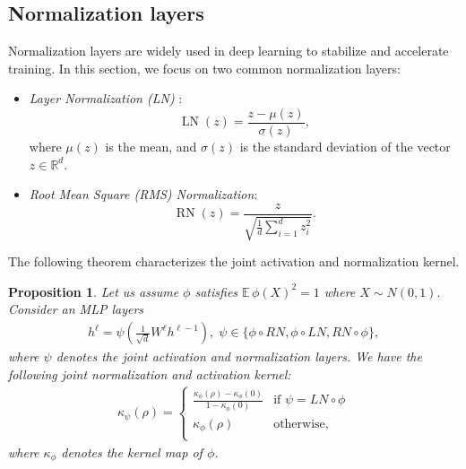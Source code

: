 \documentclass[twoside]{article}
\newcommand{\km}{\kappa_\phi}
\newcommand{\E}{\mathbb{E}\,}
\newcommand{\R}{\mathbb{R}}
\newtheorem{proposition}{Proposition}
\theoremstyle{definition}
\begin{document}

\subsection{Normalization layers}

Normalization layers are widely used in deep learning to stabilize and accelerate training. In this section, we focus on two common normalization layers:
\begin{itemize}
    \item \textit{Layer Normalization (LN)} \citep{ba2016layer}:
  \begin{equation}
  \operatorname{LN}(z) = \frac{z - \mu(z)}{\sigma(z)},
  \end{equation}
  where $\mu(z)$ is the mean, and $\sigma(z)$ is the standard deviation of the vector $z \in \R^d$.
  \item \textit{Root Mean Square (RMS) Normalization}:
  \begin{equation}
  \operatorname{RN}(z) = \frac{z}{ \sqrt{ \frac{1}{d} \sum_{i=1}^d z_i^2 } }.
  \end{equation}
\end{itemize}

The following theorem characterizes the joint activation and normalization kernel.

\begin{proposition}
\label{prop:normalization_kernel_map}
Let us assume $\phi$ satisfies $\E \phi(X)^2 = 1$ where $X\sim N(0,1).$ Consider an MLP layers 
\begin{align*}
    h^\ell = \psi\left( \frac{1}{\sqrt{d}}W^\ell h^{\ell-1}\right),
    \; \psi \in \{\phi\circ RN,\phi\circ LN, RN\circ \phi\},
\end{align*}
where $\psi$ denotes the joint activation and normalization layers. 
We have the following joint normalization and activation kernel:
\begin{align*}
    \kappa_\psi(\rho) = \begin{cases}
         \frac{\km(\rho)-\km(0)}{1-\km(0)} & \text{if } \psi=LN\circ \phi\\
        \km(\rho) & \text{otherwise},\\
    \end{cases}
\end{align*}
where $\km$ denotes the kernel map of $\phi$. 
\end{proposition}
\end{document}
